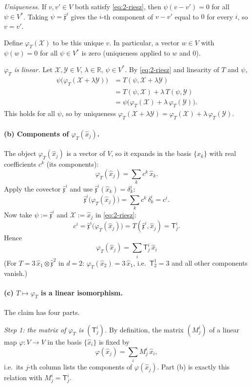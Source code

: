 \documentclass[11pt]{article}
\newcommand{\dual}{V^{*}}
\begin{document}
\smallskip
\noindent\emph{Uniqueness.} If $v,v'\in V$ both satisfy \eqref{eq:2-riesz}, then $\psi(v-v')=0$ for all $\psi\in\dual$. Taking $\psi=\hat{\mathfrak x}^i$ gives the $i$-th component of $v-v'$ equal to $0$ for every $i$, so $v=v'$.

\smallskip
Define $\varphi_T(\mathcal X)$ to be this unique $v$. In particular, a vector $w\in V$ with $\psi(w)=0$ for all $\psi\in\dual$ is zero (uniqueness applied to $w$ and $0$).

\smallskip
\noindent\emph{$\varphi_T$ is linear.} Let $\mathcal X,\mathcal Y\in V$, $\lambda\in\mathbb R$, $\psi\in\dual$. By \eqref{eq:2-riesz} and linearity of $T$ and $\psi$,
\begin{align*}
\psi\big(\varphi_T(\mathcal X+\lambda\mathcal Y)\big)
&=T(\psi,\mathcal X+\lambda\mathcal Y)\\
&=T(\psi,\mathcal X)+\lambda\,T(\psi,\mathcal Y)\\
&=\psi\big(\varphi_T(\mathcal X)+\lambda\,\varphi_T(\mathcal Y)\big).
\end{align*}
This holds for all $\psi$, so by uniqueness $\varphi_T(\mathcal X+\lambda\mathcal Y)=\varphi_T(\mathcal X)+\lambda\,\varphi_T(\mathcal Y)$.

\paragraph{(b) Components of $\varphi_T(\hat x_j)$.}
The object $\varphi_T(\hat x_j)$ is a vector of $V$, so it expands in the basis $\{\hat x_k\}$ with real coefficients $c^k$ (its components):
\[
\varphi_T(\hat x_j)=\sum_k c^k\,\hat x_k.
\]
Apply the covector $\hat{\mathfrak x}^i$ and use $\hat{\mathfrak x}^i(\hat x_k)=\delta^i_k$:
\[
\hat{\mathfrak x}^i\big(\varphi_T(\hat x_j)\big)=\sum_k c^k\,\delta^i_k=c^i.
\]
Now take $\psi:=\hat{\mathfrak x}^i$ and $\mathcal X:=\hat x_j$ in \eqref{eq:2-riesz}:
\[
c^i=\hat{\mathfrak x}^i\big(\varphi_T(\hat x_j)\big)=T(\hat{\mathfrak x}^i,\hat x_j)=\mathsf T^i_j.
\]
Hence
\[
\boxed{\;\varphi_T(\hat x_j)=\sum_i \mathsf T^i_j\,\hat x_i\;}
\]
(For $T=3\,\hat x_1\otimes\hat{\mathfrak x}^2$ in $d=2$: $\varphi_T(\hat x_2)=3\,\hat x_1$, i.e.\ $\mathsf T^1_2=3$ and all other components vanish.)

\paragraph{(c) $T\mapsto\varphi_T$ is a linear isomorphism.}
The claim has four parts.

\smallskip
\noindent\emph{Step 1: the matrix of $\varphi_T$ is $(\mathsf T^i_j)$.}
By definition, the matrix $(M^i_j)$ of a linear map $\varphi:V\to V$ in the basis $\{\hat x_i\}$ is fixed by
\[
\varphi(\hat x_j)=\sum_i M^i_j\,\hat x_i,
\]
i.e.\ its $j$-th column lists the components of $\varphi(\hat x_j)$. Part (b) is exactly this relation with $M^i_j=\mathsf T^i_j$.
\end{document}
